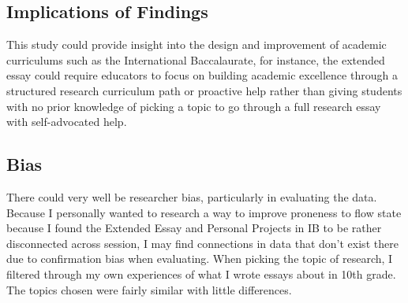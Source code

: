 \documentclass{article}
\begin{document}
\subsection{Implications of Findings}

This study could provide insight into the design and improvement of academic curriculums such as the International Baccalaurate, for instance, the extended essay could require educators to focus on building academic excellence through a structured research curriculum path or proactive help rather than giving students with no prior knowledge of picking a topic to go through a full research essay with self-advocated help.




\subsection{Bias}

There could very well be researcher bias, particularly in evaluating the data. Because I personally wanted to research a way to improve proneness to flow state because I found the Extended Essay and Personal Projects in IB to be rather disconnected across session, I may find connections in data that don't exist there due to confirmation bias when evaluating.
When picking the topic of research, I filtered through my own experiences of what I wrote essays about in 10th grade. The topics chosen were fairly similar with little differences.
\end{document}
